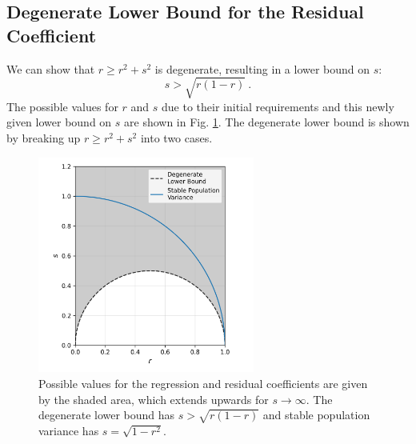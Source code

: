 \documentclass{svproc} %
\begin{document}
\subsection{Degenerate Lower Bound for the Residual Coefficient}
We can show that $r \geq r^2 + s^2$ is degenerate, resulting in a lower bound on $s$:
\begin{equation}
s > \sqrt{r(1-r)} \ .
\label{eq:lower_bound}
\end{equation}
The possible values for $r$ and $s$ due to their initial requirements and this newly given lower bound on $s$ are shown in Fig. \ref{fig:possible_r_rs}. The degenerate lower bound is shown by breaking up $r \geq r^2 + s^2$ into two cases.


\begin{figure}[h]
\includegraphics[width=2.8in]{figures/possible_r_rs.png}
\centering
\caption{Possible values for the regression and residual coefficients are given by the shaded area, which extends upwards for $s \rightarrow \infty$. The degenerate lower bound has $s > \sqrt{r(1-r)}$ and stable population variance has $s = \sqrt{1-r^2}$.}
\label{fig:possible_r_rs}
\end{figure}
\end{document}
